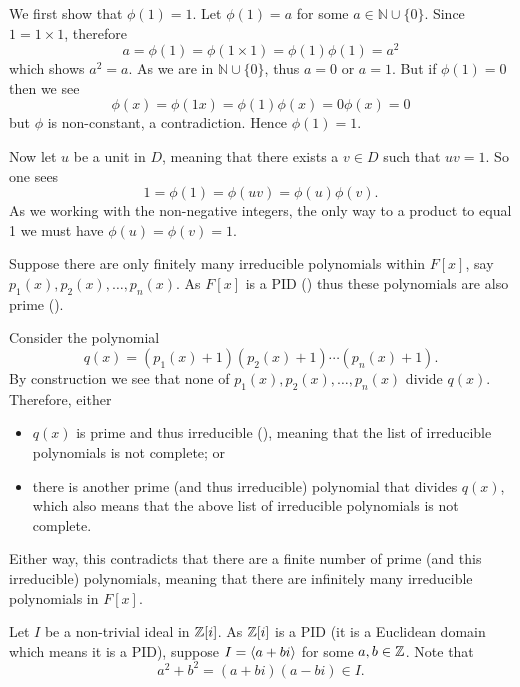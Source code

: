 \begin{questions}
    \item We first show that $\phi(1) = 1$. Let $\phi(1) = a$ for some $a \in \mathbb{N} \cup \{0\}$. Since $1 = 1 \times 1$, therefore
    \[
        a = \phi(1) = \phi(1 \times 1) = \phi(1)\phi(1) = a^2
    \]
    which shows $a^2 = a$. As we are in $\mathbb{N} \cup \{0\}$, thus $a = 0$ or $a = 1$. But if $\phi(1) = 0$ then we see
    \[
        \phi(x) = \phi(1x) = \phi(1)\phi(x) = 0\phi(x) = 0
    \]
    but $\phi$ is non-constant, a contradiction. Hence $\phi(1) = 1$.

    Now let $u$ be a unit in $D$, meaning that there exists a $v \in D$ such that $uv = 1$. So one sees
    \[
        1 = \phi(1) = \phi(uv) = \phi(u)\phi(v).
    \]
    As we working with the non-negative integers, the only way to a product to equal 1 we must have $\phi(u) = \phi(v) = 1$.

    \item Suppose there are only finitely many irreducible polynomials within $F[x]$, say $p_1(x), p_2(x), \dots, p_n(x)$. As $F[x]$ is a PID () thus these polynomials are also prime ().
    
    Consider the polynomial
    \[
        q(x) = (p_1(x) + 1)(p_2(x) + 1)\cdots(p_n(x) + 1).
    \]
    By construction we see that none of $p_1(x), p_2(x), \dots, p_n(x)$ divide $q(x)$. Therefore, either
    \begin{itemize}
        \item $q(x)$ is prime and thus irreducible (), meaning that the list of irreducible polynomials is not complete; or
        \item there is another prime (and thus irreducible) polynomial that divides $q(x)$, which also means that the above list of irreducible polynomials is not complete.
    \end{itemize}
    Either way, this contradicts that there are a finite number of prime (and this irreducible) polynomials, meaning that there are infinitely many irreducible polynomials in $F[x]$.
    
    \item Let $I$ be a non-trivial ideal in $\mathbb{Z}[i]$. As $\mathbb{Z}[i]$ is a PID (it is a Euclidean domain which means it is a PID), suppose $I = \left\langle a+bi\right\rangle$ for some $a,b \in \mathbb{Z}$. Note that
    \[
        a^2 + b^2 = (a+bi)(a-bi) \in I.
    \]


\end{questions}
